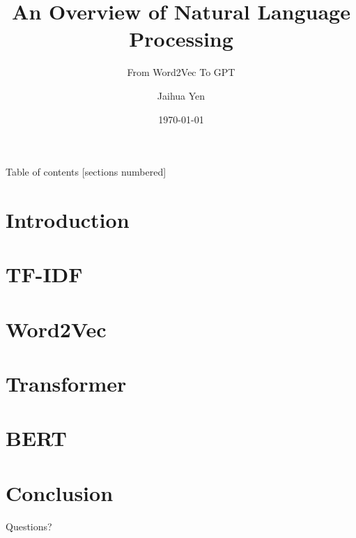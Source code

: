\documentclass[10pt]{beamer}
\title{An Overview of Natural Language Processing}
\subtitle{From Word2Vec To GPT}
\date{\today}
\author{Jaihua Yen}
\institute{QNAP}
\begin{document}
\maketitle

\begin{frame}{Table of contents}
  [sections numbered]
  \tableofcontents%
\end{frame}

\section{Introduction}



\section{TF-IDF}



\section{Word2Vec}



\section{Transformer}



\section{BERT}



\section{Conclusion}



\appendix


\begin{frame}[standout]
  Questions?
\end{frame}


\end{document}
